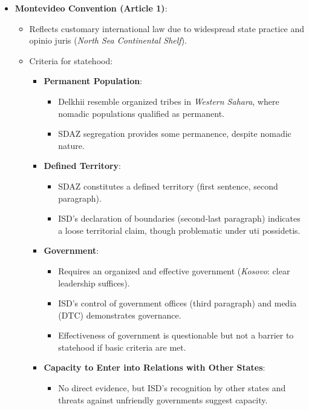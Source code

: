 \begin{itemize}
    \item \textbf{Montevideo Convention (Article 1)}:
    \begin{itemize}
        \item Reflects customary international law due to widespread state practice and opinio juris (\textit{North Sea Continental Shelf}).
        \item Criteria for statehood:
        \begin{itemize}
            \item \textbf{Permanent Population}:
            \begin{itemize}
                \item Delkhii resemble organized tribes in \textit{Western Sahara}, where nomadic populations qualified as permanent.
                \item SDAZ segregation provides some permanence, despite nomadic nature.
            \end{itemize}
            \item \textbf{Defined Territory}:
            \begin{itemize}
                \item SDAZ constitutes a defined territory (first sentence, second paragraph).
                \item ISD’s declaration of boundaries (second-last paragraph) indicates a loose territorial claim, though problematic under uti possidetis.
            \end{itemize}
            \item \textbf{Government}:
            \begin{itemize}
                \item Requires an organized and effective government (\textit{Kosovo}: clear leadership suffices).
                \item ISD’s control of government offices (third paragraph) and media (DTC) demonstrates governance.
                \item Effectiveness of government is questionable but not a barrier to statehood if basic criteria are met.
            \end{itemize}
            \item \textbf{Capacity to Enter into Relations with Other States}:
            \begin{itemize}
                \item No direct evidence, but ISD’s recognition by other states and threats against unfriendly governments suggest capacity.

\end{itemize}
\end{itemize}
\end{itemize}
\end{itemize}
